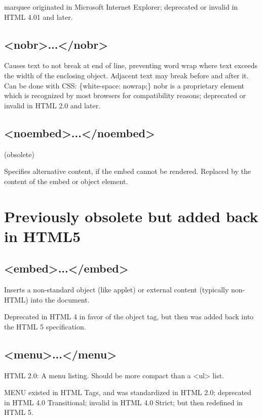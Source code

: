 marquee originated in Microsoft Internet Explorer; deprecated or invalid in HTML 4.01 and later.


\section{<nobr>...</nobr>}

Causes text to not break at end of line, preventing word wrap where text exceeds the width of the enclosing object. Adjacent text may break before and after it. Can be done with CSS: \{white-space: nowrap;\}
nobr is a proprietary element which is recognized by most browsers for compatibility reasons; deprecated or invalid in HTML 2.0 and later.


\section{<noembed>...</noembed>}

(obsolete)

Specifies alternative content, if the embed cannot be rendered. Replaced by the content of the embed or object element.







\chapter{Previously obsolete but added back in HTML5}

\section{<embed>...</embed>}


Inserts a non-standard object (like applet) or external content (typically non-HTML) into the document.

Deprecated in HTML 4 in favor of the object tag, but then was added back into the HTML 5 specification.

\section{<menu>...</menu>}

HTML 2.0: A menu listing. Should be more compact than a <ul> list.

MENU existed in HTML Tags, and was standardized in HTML 2.0; deprecated in HTML 4.0 Transitional; invalid in HTML 4.0 Strict; but then redefined in HTML 5.







